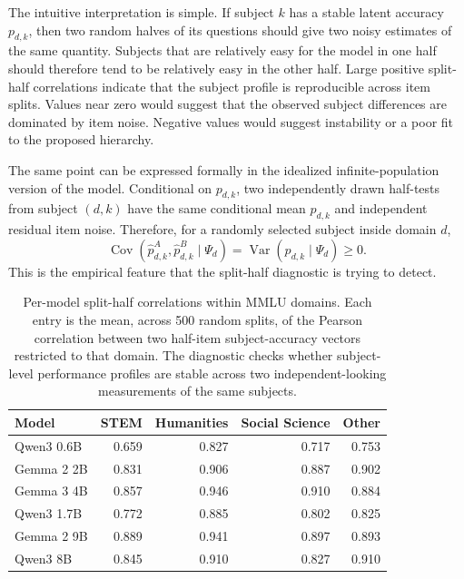 \documentclass[11pt]{article}
\DeclareMathOperator{\Var}{Var}
\DeclareMathOperator{\Cov}{Cov}
\theoremstyle{definition}
\theoremstyle{remark}
\begin{document}
The intuitive interpretation is simple.  If subject \(k\) has a stable latent accuracy \(p_{d,k}\), then two random halves of its questions should give two noisy estimates of the same quantity.  Subjects that are relatively easy for the model in one half should therefore tend to be relatively easy in the other half.  Large positive split-half correlations indicate that the subject profile is reproducible across item splits.  Values near zero would suggest that the observed subject differences are dominated by item noise.  Negative values would suggest instability or a poor fit to the proposed hierarchy.

The same point can be expressed formally in the idealized infinite-population version of the model.  Conditional on \(p_{d,k}\), two independently drawn half-tests from subject \((d,k)\) have the same conditional mean \(p_{d,k}\) and independent residual item noise.  Therefore, for a randomly selected subject inside domain \(d\),
\[
    \Cov(\hat p_{d,k}^{A},\hat p_{d,k}^{B}\mid \Psi_d)
    =
    \Var(p_{d,k}\mid \Psi_d)
    \ge 0.
\]
This is the empirical feature that the split-half diagnostic is trying to detect.

\begin{table}[h!]
\centering
\caption{Per-model split-half correlations within MMLU domains.  Each entry is the mean, across 500 random splits, of the Pearson correlation between two half-item subject-accuracy vectors restricted to that domain.  The diagnostic checks whether subject-level performance profiles are stable across two independent-looking measurements of the same subjects.}
\label{tab:mmlu-domain-split-half}
\begin{tabular}{lrrrr}
\toprule
Model & STEM & Humanities & Social Science & Other \\
\midrule
Qwen3 0.6B & 0.659 & 0.827 & 0.717 & 0.753 \\
Gemma 2 2B & 0.831 & 0.906 & 0.887 & 0.902 \\
Gemma 3 4B & 0.857 & 0.946 & 0.910 & 0.884 \\
Qwen3 1.7B & 0.772 & 0.885 & 0.802 & 0.825 \\
Gemma 2 9B & 0.889 & 0.941 & 0.897 & 0.893 \\
Qwen3 8B & 0.845 & 0.910 & 0.827 & 0.910 \\
\bottomrule
\end{tabular}
\end{table}
\end{document}
